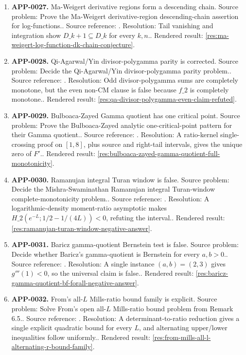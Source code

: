 \begin{enumerate}[leftmargin=*]
\item \textbf{APP-0027.} Ma-Weigert derivative regions form a descending chain.  Source problem: Prove the Ma-Weigert derivative-region descending-chain assertion for log-functions.. Source reference: \cite{ma-weigert-log-functions}. Resolution: Tail vanishing and integration show \(D\_{k+1}\subseteq D\_k\) for every \(k,n\).. Rendered result: \ref{res:ma-weigert-log-function-dk-chain-conjecture}.
\item \textbf{APP-0028.} Qi-Agarwal/Yin divisor-polygamma parity is corrected.  Source problem: Decide the Qi-Agarwal/Yin divisor-polygamma parity problem.. Source reference: \cite{app-app-0028-source}. Resolution: Odd divisor-polygamma sums are completely monotone, but the even non-CM clause is false because \(f\_2\) is completely monotone.. Rendered result: \ref{res:qa-divisor-polygamma-even-claim-refuted}.
\item \textbf{APP-0029.} Bulboaca-Zayed Gamma quotient has one critical point.  Source problem: Prove the Bulboaca-Zayed analytic one-critical-point pattern for their Gamma quotient.. Source reference: \cite{app-app-0009-source}. Resolution: A ratio-kernel single-crossing proof on \([1,8]\), plus source and right-tail intervals, gives the unique zero of \(F'\).. Rendered result: \ref{res:bulboaca-zayed-gamma-quotient-full-monotonicity}.
\item \textbf{APP-0030.} Ramanujan integral Turan window is false.  Source problem: Decide the Mishra-Swaminathan Ramanujan integral Turan-window complete-monotonicity problem.. Source reference: \cite{mishra-swaminathan-ramanujan}. Resolution: A logarithmic-density moment-ratio asymptotic makes \(H\_2(e^{-L};1/2-1/(4L))<0\), refuting the interval.. Rendered result: \ref{res:ramanujan-turan-window-negative-answer}.
\item \textbf{APP-0031.} Baricz gamma-quotient Bernstein test is false.  Source problem: Decide whether Baricz's gamma-quotient is Bernstein for every \(a,b>0\).. Source reference: \cite{baricz-turan}. Resolution: A single instance \((a,b)=(2,3)\) gives \(g'''(1)<0\), so the universal claim is false.. Rendered result: \ref{res:baricz-gamma-quotient-bf-forall-negative-answer}.
\item \textbf{APP-0032.} From's all-\(L\) Mills-ratio bound family is explicit.  Source problem: Solve From's open all-\(L\) Mills-ratio bound problem from Remark 6.5.. Source reference: \cite{from-mills}. Resolution: A determinant-to-ratio reduction gives a single explicit quadratic bound for every \(L\), and alternating upper/lower inequalities follow uniformly.. Rendered result: \ref{res:from-mills-all-l-alternating-r-bound-family}.

\end{enumerate}
